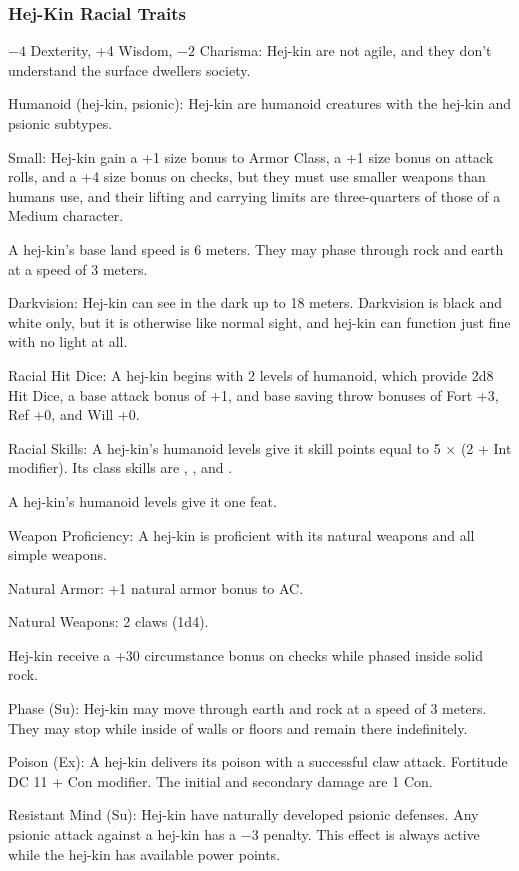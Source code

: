 \subsubsection{Hej-Kin Racial Traits}
\begin{itemize*}
    \item $-4$ Dexterity, +4 Wisdom, $-2$ Charisma: Hej-kin are not agile, and they don't understand the surface dwellers society.
    \item Humanoid (hej-kin, psionic): Hej-kin are humanoid creatures with the hej-kin and psionic subtypes.
    \item Small: Hej-kin gain a +1 size bonus to Armor Class, a +1 size bonus on attack rolls, and a +4 size bonus on  checks, but they must use smaller weapons than humans use, and their lifting and carrying limits are three-quarters of those of a Medium character.
    \item A hej-kin's base land speed is 6 meters. They may phase through rock and earth at a speed of 3 meters.

    \item Darkvision: Hej-kin can see in the dark up to 18 meters. Darkvision is black and white only, but it is otherwise like normal sight, and hej-kin can function just fine with no light at all.

    \item Racial Hit Dice: A hej-kin begins with 2 levels of humanoid, which provide 2d8 Hit Dice, a base attack bonus of +1, and base saving throw bonuses of Fort +3, Ref +0, and Will +0.
    \item Racial Skills: A hej-kin's humanoid levels give it skill points equal to 5 $\times$ (2 + Int modifier). Its class skills are , ,  and .
    \item A hej-kin's humanoid levels give it one feat.
    \item Weapon Proficiency: A hej-kin is proficient with its natural weapons and all simple weapons.

    \item Natural Armor: +1 natural armor bonus to AC.
    \item Natural Weapons: 2 claws (1d4).

	\item Hej-kin receive a +30 circumstance bonus on  checks while phased inside solid rock.
    \item Phase (Su): Hej-kin may move through earth and rock at a speed of 3 meters. They may stop while inside of walls or floors and remain there indefinitely.
	\item Poison (Ex): A hej-kin delivers its poison with a successful claw attack. Fortitude DC 11 + Con modifier. The initial and secondary damage are 1 Con.
    \item Resistant Mind (Su): Hej-kin have naturally developed psionic defenses. Any psionic attack against a hej-kin has a $-3$ penalty. This effect is always active while the hej-kin has available power points.


\end{itemize*}
